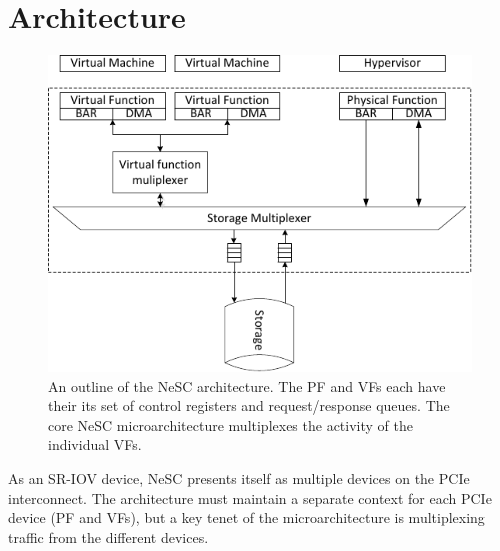 \section{Architecture}
\label{sec:arch}

\begin{figure}[t]
  \centering
  \includegraphics[width=1\columnwidth]{figs/architecture.pdf}
  \caption{An outline of the NeSC architecture. The PF and VFs each have their its set of control registers and request/response queues. The core NeSC microarchitecture multiplexes the activity of the individual VFs.}
  \label{fig:architecture}
\end{figure}



%

As an SR-IOV device, NeSC presents itself as multiple devices on the PCIe interconnect. The architecture must maintain a separate context for each PCIe device (PF and VFs), but a key tenet of the microarchitecture is multiplexing traffic from the different devices.

